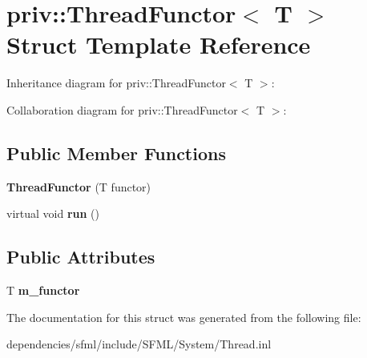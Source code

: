 \hypertarget{structpriv_1_1_thread_functor}{}\section{priv\+:\+:Thread\+Functor$<$ T $>$ Struct Template Reference}
\label{structpriv_1_1_thread_functor}


Inheritance diagram for priv\+:\+:Thread\+Functor$<$ T $>$\+:


Collaboration diagram for priv\+:\+:Thread\+Functor$<$ T $>$\+:
\subsection*{Public Member Functions}
\begin{DoxyCompactItemize}
\item 
\mbox{\label{structpriv_1_1_thread_functor_a2df57df5cd6f7396b033512bb0e01848}} 
{\bfseries Thread\+Functor} (T functor)
\item 
\mbox{\label{structpriv_1_1_thread_functor_a8bb44b4b46d08d844d070ae3fdb251d7}} 
virtual void {\bfseries run} ()
\end{DoxyCompactItemize}
\subsection*{Public Attributes}
\begin{DoxyCompactItemize}
\item 
\mbox{\label{structpriv_1_1_thread_functor_a73254bbde4d3452de1aeda531ca632b2}} 
T {\bfseries m\+\_\+functor}
\end{DoxyCompactItemize}


The documentation for this struct was generated from the following file\+:\begin{DoxyCompactItemize}
\item 
dependencies/sfml/include/\+S\+F\+M\+L/\+System/Thread.\+inl\end{DoxyCompactItemize}
